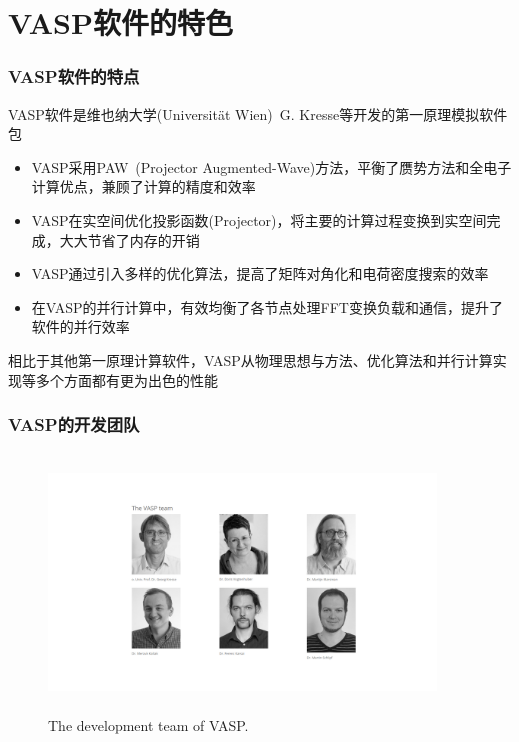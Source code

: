 {\section{\rm{VASP}软件的特色}
\frame
{
	\frametitle{\textrm{VASP}软件的特点}
	\textrm{VASP}软件是维也纳大学\textrm{(Universit\"at Wien)}~\textrm{G. Kresse}等开发的第一原理模拟软件包
	\begin{itemize}
		\item \textrm{VASP}采用\textrm{PAW~(Projector Augmented-Wave)}方法，平衡了赝势方法和全电子计算优点，兼顾了计算的精度和效率
		\item \textrm{VASP}在实空间优化投影函数\textrm{(Projector)}，将主要的计算过程变换到实空间完成，大大节省了内存的开销%
		\item \textrm{VASP}通过引入多样的优化算法，提高了矩阵对角化和电荷密度搜索的效率
		\item 在\textrm{VASP}的并行计算中，有效均衡了各节点处理\textrm{FFT}变换负载和通信，提升了软件的并行效率
	\end{itemize}
	相比于其他第一原理计算软件，\textrm{VASP}从物理思想与方法、优化算法和并行计算实现等多个方面都有更为出色的性能
}

\frame
{
	\frametitle{\textrm{VASP}的开发团队}
\begin{figure}[h!]
\centering
\vspace*{-0.25in}
\includegraphics[height=2.70in,width=4.05in,viewport=330 130 1280 770,clip]{Figures/VASP_team.png}
\caption{\tiny \textrm{The development team of VASP.}}%
\label{VASP_team}
\end{figure}
}

}
